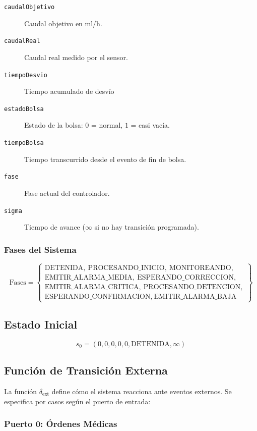 \documentclass[12pt,a4paper,oneside]{report}
\begin{document}
\begin{description}
    \item[\texttt{caudalObjetivo}] Caudal objetivo en ml/h.
    \item[\texttt{caudalReal}] Caudal real medido por el sensor.
    \item[\texttt{tiempoDesvio}] Tiempo acumulado de desvío
    \item[\texttt{estadoBolsa}] Estado de la bolsa: $0$ = normal, $1$ = casi vacía.
    \item[\texttt{tiempoBolsa}] Tiempo transcurrido desde el evento de fin de bolsa.
    \item[\texttt{fase}] Fase actual del controlador.
    \item[\texttt{sigma}] Tiempo de avance ($\infty$ si no hay transición programada).
\end{description}

\subsubsection{Fases del Sistema}

\[
\text{Fases} =
\left\{
\begin{array}{l}
\text{DETENIDA},\ \text{PROCESANDO\_INICIO},\ \text{MONITOREANDO},\\
\text{EMITIR\_ALARMA\_MEDIA},\ \text{ESPERANDO\_CORRECCION},\\
\text{EMITIR\_ALARMA\_CRITICA},\ \text{PROCESANDO\_DETENCION},\\
\text{ESPERANDO\_CONFIRMACION},\ \text{EMITIR\_ALARMA\_BAJA}
\end{array}
\right\}
\]

\subsection{Estado Inicial}

\[
s_0 = (0, 0, 0, 0, 0, \text{DETENIDA}, \infty)
\]

\subsection{Función de Transición Externa}

La función $\delta_{\text{ext}}$ define cómo el sistema reacciona ante eventos externos. Se especifica por casos según el puerto de entrada:

\subsubsection{Puerto 0: Órdenes Médicas}
\end{document}
